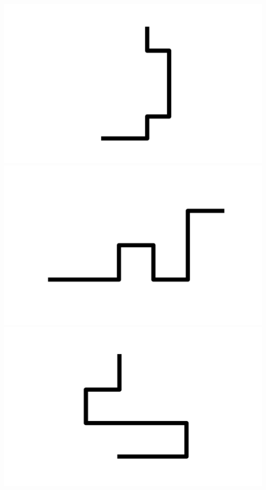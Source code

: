 \documentclass[]{report}
\begin{document}
\includegraphics[scale=.1]{pictures/21/state_cluster_shapes_334.pdf} 
\includegraphics[scale=.1]{pictures/21/state_cluster_shapes_335.pdf} 
\includegraphics[scale=.1]{pictures/21/state_cluster_shapes_336.pdf} 
\end{document}
